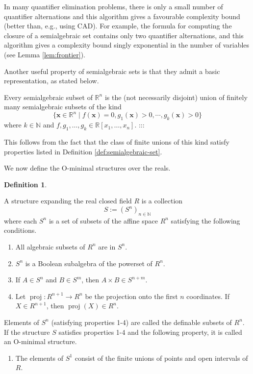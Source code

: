 \documentclass[
]{book}
\providecommand{\tightlist}{%
  \setlength{\itemsep}{0pt}\setlength{\parskip}{0pt}}
\theoremstyle{definition}
\newtheorem{definition}{Definition}[chapter]
\theoremstyle{definition}
\theoremstyle{definition}
\theoremstyle{definition}
\theoremstyle{remark}
\begin{document}
In many quantifier elimination problems, there is only a small number of quantifier alternations and this algorithm gives a favourable complexity bound (better than, e.g., using CAD). For example, the formula for computing the closure of a semialgebraic set contains only two quantifier alternations, and this algorithm gives a complexity bound singly exponential in the number of variables (see Lemma \ref{lem:frontier}).

Another useful property of semialgebraic sets is that they admit a basic representation, as stated below.

Every semialgebraic subset of \(\mathbb{R}^n\) is the (not necessarily disjoint) union of finitely many semialgebraic subsets of the kind
\[
\{ \mathbf{x} \in \mathbb{R}^n \mid f(\mathbf{x}) = 0, g_1(\mathbf{x}) > 0, \cdots, g_k(\mathbf{x}) > 0 \}
\]
where \(k \in \mathbb{N}\) and \(f,g_1,\ldots,g_k \in \mathbb{R}[x_1,\ldots,x_n]\).
:::

This follows from the fact that the class of finite unions of this kind satisfy properties listed in Definition \ref{def:semialgebraic-set}.

We now define the O-minimal structures over the reals.

\begin{definition}
\protect\hypertarget{def:definable-set}{}\label{def:definable-set}

A structure expanding the real closed field \(R\) is a collection \[
S := (S^n)_{n \in \mathbb{N}}
\]
where each \(S^n\) is a set of subsets of the affine space \(R^n\) satisfying the following conditions.

\begin{enumerate}
\def\labelenumi{\arabic{enumi}.}
\tightlist
\item
  All algebraic subsets of \(R^n\) are in \(S^n\).
\item
  \(S^n\) is a Boolean subalgebra of the powerset of \(R^n\).
\item
  If \(A \in S^n\) and \(B \in S^m\), then \(A \times B \in S^{n+m}\).
\item
  Let \(\operatorname{proj}: R^{n+1} \to R^n\) be the projection onto the first \(n\) coordinates. If \(X\in R^{n+1}\), then \(\operatorname{proj}(X) \in R^n\).
\end{enumerate}

Elements of \(S^n\) (satisfying properties 1-4) are called the definable subsets of \(R^n\).
If the structure \(S\) satisfies properties 1-4 and the following property, it is called an O-minimal structure.

\begin{enumerate}
\def\labelenumi{\arabic{enumi}.}
\setcounter{enumi}{4}
\tightlist
\item
  The elements of \(S^1\) consist of the finite unions of points and open intervals of \(R\).
\end{enumerate}

\end{definition}
\end{document}
